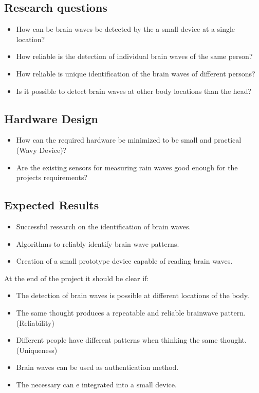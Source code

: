 \documentclass[a4paper,11pt]{article}
\begin{document}
\subsection{Research questions}
\begin{itemize}
	\item How can be brain waves be detected by the a small device at a single location?
	\item How reliable is the detection of individual brain waves of the same person?
	\item How reliable is unique identification of the brain waves of different persons?
	\item Is it possible to detect brain waves at other body locations than the head?
\end{itemize}

\subsection{Hardware Design}
\begin{itemize}
	\item How can the required hardware be minimized to be small and practical (Wavy Device)?
	\item Are the existing sensors for measuring rain waves good enough for the projects requirements?
\end{itemize}

\subsection{Expected Results}
\begin{itemize}
	\item Successful research on the identification of brain waves.
	\item Algorithms to reliably identify brain wave patterns.
	\item Creation of a small prototype device capable of reading brain waves.
\end{itemize}

At the end of the project it should be clear if:
\begin{itemize}
	\item The detection of brain waves is possible at different locations of the body.
	\item The same thought produces a repeatable and reliable brainwave pattern. (Reliability)
	\item Different people have different patterns when thinking the same thought. (Uniqueness)
	\item Brain waves can be used as authentication method.
	\item The necessary can e integrated into a small device.
\end{itemize}
\end{document}
